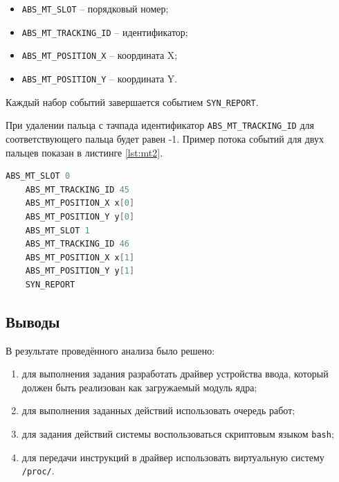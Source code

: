 \begin{itemize}
	\item \texttt{ABS\_MT\_SLOT} -- порядковый номер;
	\item \texttt{ABS\_MT\_TRACKING\_ID} -- идентификатор;
	\item \texttt{ABS\_MT\_POSITION\_X} -- координата X;
	\item \texttt{ABS\_MT\_POSITION\_Y} -- координата Y.
\end{itemize}

Каждый набор событий завершается событием \texttt{SYN\_REPORT}. 

При удалении пальца с тачпада идентификатор \texttt{ABS\_MT\_TRACKING\_ID} для соответствующего пальца будет равен -1. Пример потока событий для двух пальцев показан в листинге \ref{lst:mt2}.

\clearpage

\begin{lstlisting}[language=c, label=lst:mt2, caption={Поток событий для двух пальцев}]
	ABS_MT_SLOT 0
	ABS_MT_TRACKING_ID 45
	ABS_MT_POSITION_X x[0]
	ABS_MT_POSITION_Y y[0]
	ABS_MT_SLOT 1
	ABS_MT_TRACKING_ID 46
	ABS_MT_POSITION_X x[1]
	ABS_MT_POSITION_Y y[1]
	SYN_REPORT
\end{lstlisting}

\subsection{Выводы}

В результате проведённого анализа было решено:
\begin{enumerate}
	\item для выполнения задания разработать драйвер устройства ввода, который должен быть реализован как загружаемый модуль ядра;
	\item для выполнения заданных действий использовать очередь работ;
	\item для задания действий системы воспользоваться скриптовым языком \texttt{bash};
	\item для передачи инструкций в драйвер использовать виртуальную систему \texttt{/proc/}.
\end{enumerate}

\clearpage